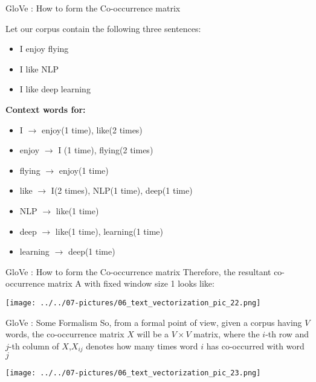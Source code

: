 \documentclass[11pt]{beamer}
\begin{document}
\begin{frame}{GloVe : How to form the Co-occurrence matrix}

Let our corpus contain the following three sentences:
	\begin{itemize}
		\item I enjoy flying
		\item I like NLP
		\item I like deep learning
	\end{itemize}
\vspace{0.25cm}
\textbf{Context words for: }
\vspace{0.25cm}
	\begin{itemize}
		\item I $\rightarrow$ enjoy(1 time), like(2 times)
		\item enjoy $\rightarrow$ I (1 time), flying(2 times)
		\item flying $\rightarrow$ enjoy(1 time)
		\item like $\rightarrow$ I(2 times), NLP(1 time), deep(1 time)
		\item NLP $\rightarrow$ like(1 time)
		\item deep $\rightarrow$ like(1 time), learning(1 time)
		\item learning $\rightarrow$ deep(1 time)
	\end{itemize}
\end{frame}
\begin{frame}{GloVe : How to form the Co-occurrence matrix}
	Therefore, the resultant co-occurrence matrix A with fixed window size 1 looks like:
	\begin{center}
	\texttt{[image: ../../07-pictures/06\_text\_vectorization\_pic\_22.png]}
	\end{center}
\end{frame}
\begin{frame}{GloVe : Some Formalism	}
	So, from a formal point of view, given a corpus having $V$ words, the co-occurrence matrix $X$ will be a $V  \times V$ matrix, where the $i$-th row and $j$-th column of $X$,$X_{ij}$ denotes how many times word $i$ has co-occurred with word $j$
	\begin{center}
	\texttt{[image: ../../07-pictures/06\_text\_vectorization\_pic\_23.png]}
	\end{center}
\end{frame}
\end{document}
